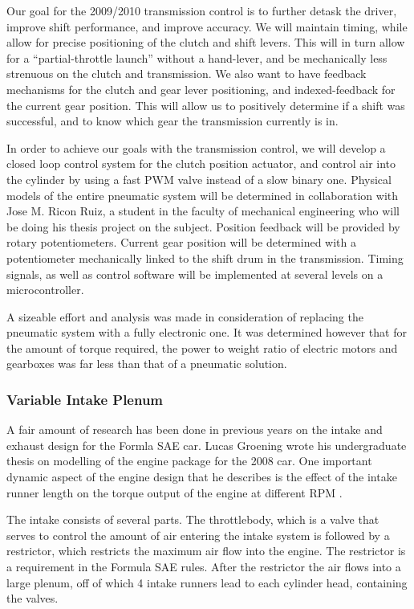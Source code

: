 Our goal for the 2009/2010 transmission control is to further detask the driver, improve shift performance, and improve accuracy. We will maintain timing, while allow for precise positioning of the clutch and shift levers. This will in turn allow for a {}``partial-throttle launch'' without a hand-lever, and be mechanically less strenuous on the clutch and transmission. We also want to have feedback mechanisms for the clutch and gear lever positioning, and indexed-feedback for the current gear position. This will allow us to positively determine if a shift was successful, and to know which gear the transmission currently is in.

In order to achieve our goals with the transmission control, we will develop a closed loop control system for the clutch position actuator, and control air into the cylinder by using a fast PWM valve instead of a slow binary one. Physical models of the entire pneumatic system will be determined in collaboration with Jose M. Ricon Ruiz, a student in the faculty of mechanical engineering who will be doing his thesis project on the subject. Position feedback will be provided by rotary potentiometers. Current gear position will be determined with a potentiometer mechanically linked to the shift drum in the transmission. Timing signals, as well as control software will be implemented at several levels on a microcontroller.

A sizeable effort and analysis was made in consideration of replacing the pneumatic system with a fully electronic one. It was determined however that for the amount of torque required, the power to weight ratio of electric motors and gearboxes was far less than that of a pneumatic solution.

\subsubsection{Variable Intake Plenum}

A fair amount of research has been done in previous years on the intake and exhaust design for the Formla SAE car. Lucas Groening wrote his undergraduate thesis on modelling of the engine package for the 2008 car. One important dynamic aspect of the engine design that he describes is the effect of the intake runner length on the torque output of the engine at different RPM \cite{Modelingof20}.

The intake consists of several parts. The throttlebody, which is a valve that serves to control the amount of air entering the intake system is followed by a restrictor, which restricts the maximum air flow into the engine. The restrictor is a requirement in the Formula SAE rules. After the restrictor the air flows into a large plenum, off of which 4 intake runners lead to each cylinder head, containing the valves.

